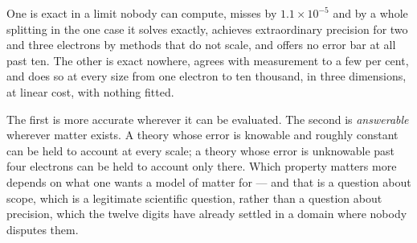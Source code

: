 \documentclass[11pt]{article}
\begin{document}
One is exact in a limit nobody can compute, misses by $1.1\times10^{-5}$ and by a whole splitting
in the one case it solves exactly, achieves extraordinary precision for two and three electrons by
methods that do not scale, and offers no error bar at all past ten. The other is exact nowhere, agrees with
measurement to a few per cent, and does so at every size from one electron to ten thousand, in
three dimensions, at linear cost, with nothing fitted.

The first is more accurate wherever it can be evaluated. The second is \emph{answerable} wherever
matter exists. A theory whose error is knowable and roughly constant can be held to account at
every scale; a theory whose error is unknowable past four electrons can be held to account only
there. Which property matters more depends on what one wants a model of matter for --- and that is
a question about scope, which is a legitimate scientific question, rather than a question about
precision, which the twelve digits have already settled in a domain where nobody disputes them.
\end{document}
